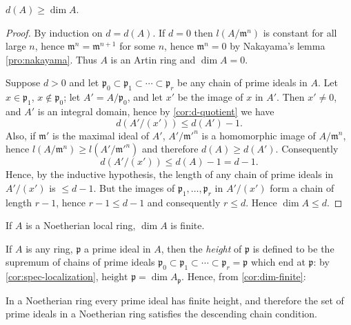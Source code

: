 \begin{proposition}\label{prop:d-leq-dim}
$d(A) \geq \dim A$.
\end{proposition}

\begin{proof}
By induction on $d = d(A)$. If $d = 0$ then $l(A/\mathfrak{m}^n)$ is constant for all large $n$, hence $\mathfrak{m}^n = \mathfrak{m}^{n+1}$ for some $n$, hence $\mathfrak{m}^n = 0$ by Nakayama's lemma \eqref{pro:nakayama}. Thus $A$ is an Artin ring and $\dim A = 0$.

Suppose $d > 0$ and let $\mathfrak{p}_0 \subset \mathfrak{p}_1 \subset \cdots \subset \mathfrak{p}_r$ be any chain of prime ideals in $A$. Let $x \in \mathfrak{p}_1$, $x \notin \mathfrak{p}_0$; let $A' = A/\mathfrak{p}_0$, and let $x'$ be the image of $x$ in $A'$. Then $x' \neq 0$, and $A'$ is an integral domain, hence by \eqref{cor:d-quotient} we have
\[
    d(A'/(x')) \leq d(A') - 1.
\]
Also, if $\mathfrak{m}'$ is the maximal ideal of $A'$, $A'/\mathfrak{m}'^n$ is a homomorphic image of $A/\mathfrak{m}^n$, hence $l(A/\mathfrak{m}^n) \geq l(A'/\mathfrak{m}'^n)$ and therefore $d(A) \geq d(A')$. Consequently
\[
    d(A'/(x')) \leq d(A) - 1 = d - 1.
\]
Hence, by the inductive hypothesis, the length of any chain of prime ideals in $A'/(x')$ is $\leq d - 1$. But the images of $\mathfrak{p}_1, \ldots, \mathfrak{p}_r$ in $A'/(x')$ form a chain of length $r - 1$, hence $r - 1 \leq d - 1$ and consequently $r \leq d$. Hence $\dim A \leq d$.
\end{proof}

\begin{corollary}\label{cor:dim-finite}
If $A$ is a Noetherian local ring, $\dim A$ is finite.
\end{corollary}

If $A$ is any ring, $\mathfrak{p}$ a prime ideal in $A$, then the \emph{height} of $\mathfrak{p}$ is defined to be the supremum of chains of prime ideals $\mathfrak{p}_0 \subset \mathfrak{p}_1 \subset \cdots \subset \mathfrak{p}_r = \mathfrak{p}$ which end at $\mathfrak{p}$: by \eqref{cor:spec-localization}, $\text{height } \mathfrak{p} = \dim A_{\mathfrak{p}}$. Hence, from \eqref{cor:dim-finite}:

\begin{corollary}\label{cor:finite-height}
In a Noetherian ring every prime ideal has finite height, and therefore the set of prime ideals in a Noetherian ring satisfies the descending chain condition.
\end{corollary}

